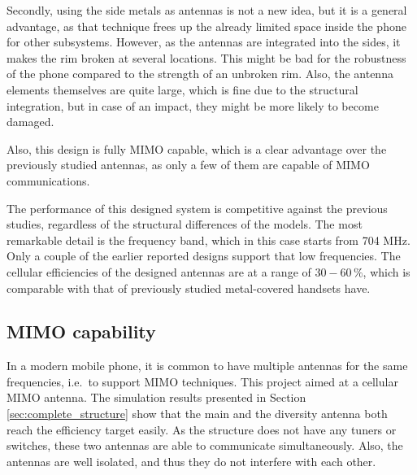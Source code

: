 Secondly, using the side metals as antennas is not a new idea, but it is a general advantage, as that technique frees up the already limited space inside the phone for other subsystems. However, as the antennas are integrated into the sides, it makes the rim broken at several locations. This might be bad for the robustness of the phone compared to the strength of an unbroken rim. Also, the antenna elements themselves are quite large, which is fine due to the structural integration, but in case of an impact, they might be more likely to become damaged.

Also, this design is fully MIMO capable, which is a clear advantage over the previously studied antennas, as only a few of them are capable of MIMO communications. 

The performance of this designed system is competitive against the previous studies, regardless of the structural differences of the models. The most remarkable detail is the frequency band, which in this case starts from 704 MHz. Only a couple of the earlier reported designs support that low frequencies. The cellular efficiencies of the designed antennas are at a range of $30-60\,\%$, which is comparable with that of previously studied metal-covered handsets have.


\subsection{MIMO capability}
\label{sec:mimo_cap}
In a modern mobile phone, it is common to have multiple antennas for the same frequencies, i.e.\ to support MIMO techniques. This project aimed at a cellular MIMO antenna. The simulation results presented in Section \ref{sec:complete_structure} show that the main and the diversity antenna both reach the efficiency target easily. As the structure does not have any tuners or switches, these two antennas are able to communicate simultaneously. Also, the antennas are well isolated, and thus they do not interfere with each other.

